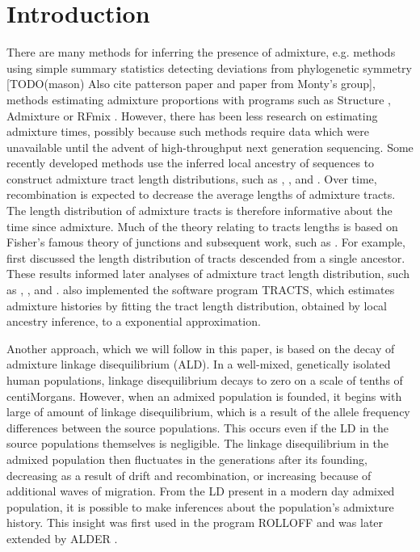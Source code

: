 \documentclass[10pt]{article}
\begin{document}
\section*{Introduction}
There are many methods for inferring the presence of
admixture, e.g. methods using simple summary statistics detecting deviations
from phylogenetic symmetry \cite{reich2009reconstructing} [TODO(mason) Also cite
patterson paper and paper from Monty's group], methods estimating admixture
proportions with programs such as Structure \cite{pritchard2000inference},
Admixture \cite{alexander2009fast} or RFmix \cite{maples2013rfmix}. However,
there has been less research on estimating admixture times,
possibly because such methods require data which were unavailable until the
advent of high-throughput next generation sequencing. Some recently developed
methods use the inferred local ancestry of sequences to construct admixture
tract length distributions, such as \cite{pool2009inference},
\cite{gravel2012population}, and \cite{liang2014lengths}.
Over time, recombination is expected to decrease the average lengths of admixture
tracts. The length distribution of admixture tracts is therefore informative
about the time since admixture.  Much of the theory relating to tracts lengths
is based on Fisher's famous theory of junctions \cite{fisher1949theory} and
subsequent work, such as
\cite{
	stam1980distribution,
	guo1994computation,
	bickeboller1996distribution,
	bickeboller1996probability,
	stefanov2000distribution,
	ball2005evaluation,
	cannings2003identity,
	dimitropoulou2003recsim,
	walters2005probability,
	rodolphe2008theoretical
}.
For example, \cite{baird2003distribution} first
discussed the length distribution of tracts descended from a single ancestor.
These results informed later analyses of admixture tract length distribution,
such as \cite{pool2009inference}, \cite{gravel2012population}, and
\cite{liang2014lengths}. \cite{gravel2012population} also implemented the
software program TRACTS, which estimates admixture histories by fitting the
tract length distribution, obtained by local ancestry inference, to a
exponential approximation.

Another approach, which we will follow in this paper, is based on the decay of
admixture linkage disequilibrium (ALD). In a well-mixed, genetically isolated
human populations, linkage disequilibrium decays to zero on a scale of tenths of
centiMorgans. However, when an admixed population is founded, it begins with
large of amount of linkage disequilibrium, which is a result of the allele
frequency differences between the source populations. This occurs even if the LD
in the source populations themselves is negligible. The linkage disequilibrium
in the admixed population then fluctuates in the generations after its founding,
decreasing as a result of drift and recombination, or increasing because of
additional waves of migration. From the LD present in a modern day admixed
population, it is possible to make inferences about the population's admixture
history. This insight was first used in the program ROLLOFF
\cite{moorjani2011history} and was later extended by ALDER
\cite{loh2013inferring}.
\end{document}
